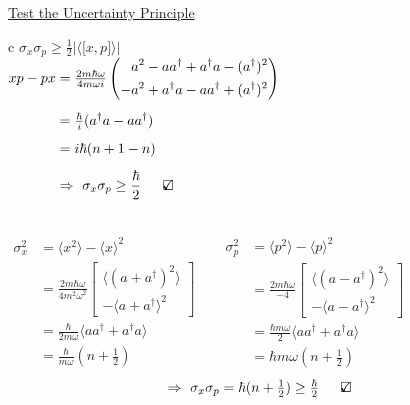 \documentclass[12pt]{article}
\newcommand{\checkedbox}{\mbox{\ooalign{$\checkmark$\cr\hidewidth$\square$\hidewidth\cr}}} %
\begin{document}
\begin{minipage}[t]{.55\textwidth}
    \setlength{\parindent}{.5cm}
    \noindent
    \underline{Test the Uncertainty Principle}\\[10pt]
    { \setlength{\tabcolsep}{0pt}
    \begin{tabular}{c}
        \( \sigma_x \sigma_p \geq \frac{1}{2} 
            \Big| \Big\langle \big[ x,p \big] \Big\rangle \Big| \)\\[20pt]
        \( \begin{aligned} 
            xp-px &= \tfrac{2 m \hbar \omega}{4 m \omega i}
                \left( \begin{aligned}
                      a^2 - a a^\dagger + a^\dagger a - (a^\dagger)^2 \\
                    - a^2 + a^\dagger a - a a^\dagger + (a^\dagger)^2
                \end{aligned} \right) \\[5pt]
            &= \tfrac{\hbar}{i} (a^\dagger a - a a^\dagger) \\[5pt]
            &= i \hbar (n+1 - n)\\[5pt]
            &\Rightarrow \ \sigma_x \sigma_p \geq \frac{\hbar}{2} \indent \checkedbox
        \end{aligned} \)
    \end{tabular} }\\[15pt]
    \noindent
    \( \begin{aligned}
        \sigma_x^2 &= \langle x^2 \rangle 
            - \langle x \rangle^2 \\[5pt]
        &= \tfrac{ 2 m \hbar \omega }{4 m^2 \omega^2} 
            \left[ \begin{aligned}
                \langle (a + a^\dagger)^2 \rangle \\
                - \langle a + a^\dagger \rangle^2 
            \end{aligned} \right]\\[5pt]
        &= \tfrac{\hbar}{2 m \omega} \langle a a^\dagger + a^\dagger a \rangle \\[5pt]
        &= \tfrac{\hbar}{m \omega} (n + \tfrac{1}{2}) 
    \end{aligned} \) \ \ 
    \( \begin{aligned}
        \sigma_p^2 &= \langle p^2 \rangle 
            - \langle p \rangle^2 \\[5pt]
        &= \tfrac{ 2 m \hbar \omega }{-4} 
            \left[ \begin{aligned}
                \langle (a - a^\dagger)^2 \rangle \\
                - \langle a - a^\dagger \rangle^2 
            \end{aligned} \right]\\[5pt]
        &= \tfrac{\hbar m \omega}{2} \langle a a^\dagger + a^\dagger a \rangle \\[5pt]
        &= \hbar m \omega (n + \tfrac{1}{2}) 
    \end{aligned} \)\\[10pt]
    \[ \Rightarrow \ \sigma_x \sigma_p = \hbar (n+ \tfrac{1}{2}) \geq \tfrac{\hbar}{2} 
        \indent \checkedbox \]
\end{minipage}
\end{document}
